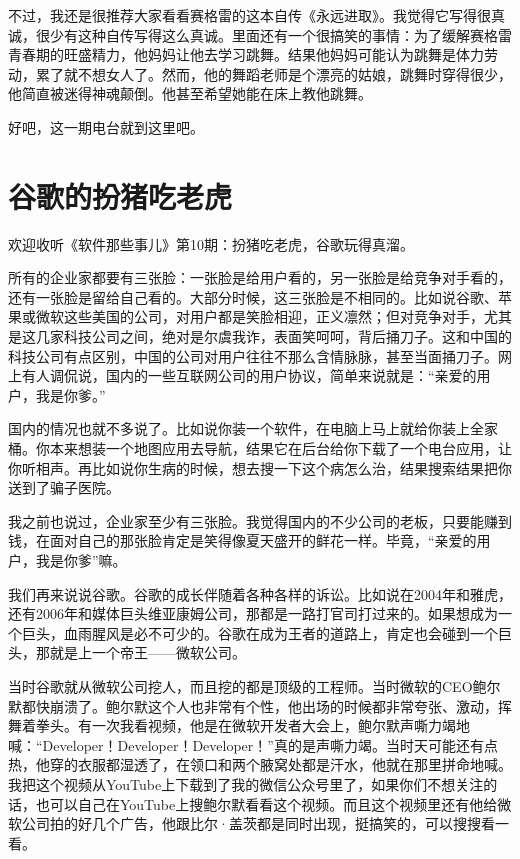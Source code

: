 \documentclass[
  letterpaper,
  DIV=11,
  numbers=noendperiod]{scrreprt}
\begin{document}
不过，我还是很推荐大家看看赛格雷的这本自传《永远进取》。我觉得它写得很真诚，很少有这种自传写得这么真诚。里面还有一个很搞笑的事情：为了缓解赛格雷青春期的旺盛精力，他妈妈让他去学习跳舞。结果他妈妈可能认为跳舞是体力劳动，累了就不想女人了。然而，他的舞蹈老师是个漂亮的姑娘，跳舞时穿得很少，他简直被迷得神魂颠倒。他甚至希望她能在床上教他跳舞。

好吧，这一期电台就到这里吧。


\chapter{谷歌的扮猪吃老虎}\label{ux8c37ux6b4cux7684ux626eux732aux5403ux8001ux864e}

欢迎收听《软件那些事儿》第10期：扮猪吃老虎，谷歌玩得真溜。

所有的企业家都要有三张脸：一张脸是给用户看的，另一张脸是给竞争对手看的，还有一张脸是留给自己看的。大部分时候，这三张脸是不相同的。比如说谷歌、苹果或微软这些美国的公司，对用户都是笑脸相迎，正义凛然；但对竞争对手，尤其是这几家科技公司之间，绝对是尔虞我诈，表面笑呵呵，背后捅刀子。这和中国的科技公司有点区别，中国的公司对用户往往不那么含情脉脉，甚至当面捅刀子。网上有人调侃说，国内的一些互联网公司的用户协议，简单来说就是：``亲爱的用户，我是你爹。''

国内的情况也就不多说了。比如说你装一个软件，在电脑上马上就给你装上全家桶。你本来想装一个地图应用去导航，结果它在后台给你下载了一个电台应用，让你听相声。再比如说你生病的时候，想去搜一下这个病怎么治，结果搜索结果把你送到了骗子医院。

我之前也说过，企业家至少有三张脸。我觉得国内的不少公司的老板，只要能赚到钱，在面对自己的那张脸肯定是笑得像夏天盛开的鲜花一样。毕竟，``亲爱的用户，我是你爹''嘛。

我们再来说说谷歌。谷歌的成长伴随着各种各样的诉讼。比如说在2004年和雅虎，还有2006年和媒体巨头维亚康姆公司，那都是一路打官司打过来的。如果想成为一个巨头，血雨腥风是必不可少的。谷歌在成为王者的道路上，肯定也会碰到一个巨头，那就是上一个帝王------微软公司。

当时谷歌就从微软公司挖人，而且挖的都是顶级的工程师。当时微软的CEO鲍尔默都快崩溃了。鲍尔默这个人也非常有个性，他出场的时候都非常夸张、激动，挥舞着拳头。有一次我看视频，他是在微软开发者大会上，鲍尔默声嘶力竭地喊：``Developer！Developer！Developer！''真的是声嘶力竭。当时天可能还有点热，他穿的衣服都湿透了，在领口和两个腋窝处都是汗水，他就在那里拼命地喊。我把这个视频从YouTube上下载到了我的微信公众号里了，如果你们不想关注的话，也可以自己在YouTube上搜鲍尔默看看这个视频。而且这个视频里还有他给微软公司拍的好几个广告，他跟比尔·盖茨都是同时出现，挺搞笑的，可以搜搜看一看。
\end{document}
